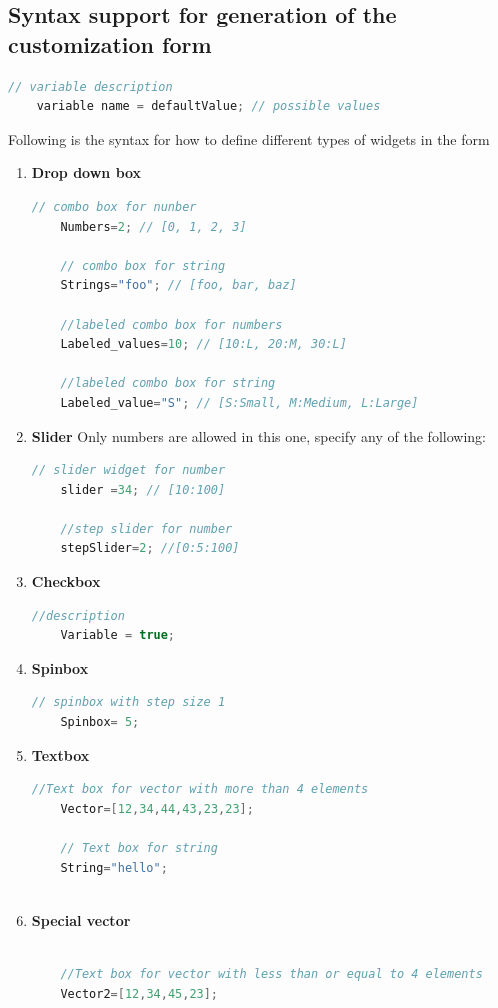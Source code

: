 \subsection{Syntax support for generation of the customization form}

    \begin{lstlisting}[language=c++]
    // variable description
    variable name = defaultValue; // possible values
    \end{lstlisting}

Following is the syntax for how to define different types of widgets in the form

\begin{enumerate}
    \item \textbf{Drop down box}
    \begin{lstlisting}[language=c++]
    // combo box for nunber
    Numbers=2; // [0, 1, 2, 3]
   
    // combo box for string
    Strings="foo"; // [foo, bar, baz]
   
    //labeled combo box for numbers
    Labeled_values=10; // [10:L, 20:M, 30:L]
   
    //labeled combo box for string
    Labeled_value="S"; // [S:Small, M:Medium, L:Large]
    \end{lstlisting}
    \item \textbf{Slider} Only numbers are allowed in this one, specify any of the following:
    \begin{lstlisting}[language=c++]
    // slider widget for number
    slider =34; // [10:100]
   
    //step slider for number
    stepSlider=2; //[0:5:100]
    \end{lstlisting}
    \item \textbf{Checkbox}
    \begin{lstlisting}[language=c++]
    //description
    Variable = true;
    \end{lstlisting}
    \item \textbf{Spinbox}
    \begin{lstlisting}[language=c++]
    // spinbox with step size 1
    Spinbox= 5;
    \end{lstlisting}
    \item \textbf{Textbox}
    \begin{lstlisting}[language=c++]
    //Text box for vector with more than 4 elements
    Vector=[12,34,44,43,23,23];
   
    // Text box for string
    String="hello";
   
    \end{lstlisting}
    \item \textbf{Special vector}
    \begin{lstlisting}[language=c++]
   
    //Text box for vector with less than or equal to 4 elements
    Vector2=[12,34,45,23];
    \end{lstlisting}

\end{enumerate}

